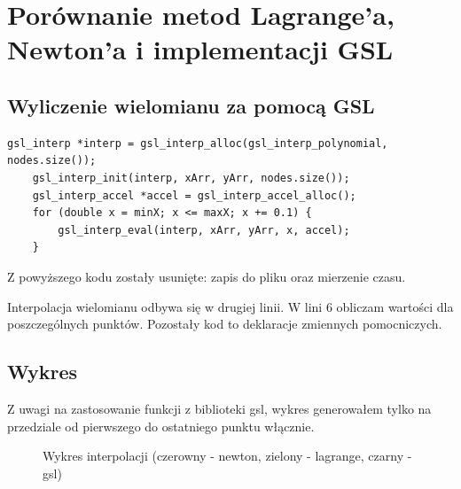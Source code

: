 \documentclass{article}
\begin{document}
    \pagebreak

    \section{Porównanie metod Lagrange'a, Newton'a i implementacji GSL}
    \subsection{Wyliczenie wielomianu za pomocą GSL}
    \lstset {language=C++}
    \begin{lstlisting}[caption={Interpolacja za pomocą GSL}]
    gsl_interp *interp = gsl_interp_alloc(gsl_interp_polynomial, nodes.size());
    gsl_interp_init(interp, xArr, yArr, nodes.size());
    gsl_interp_accel *accel = gsl_interp_accel_alloc();
    for (double x = minX; x <= maxX; x += 0.1) {
        gsl_interp_eval(interp, xArr, yArr, x, accel);
    }
    \end{lstlisting}

    Z powyższego kodu zostały usunięte: zapis do pliku oraz mierzenie czasu.

    Interpolacja wielomianu odbywa się w drugiej linii. W lini 6 obliczam wartości dla poszczególnych punktów.
    Pozostały kod to deklaracje zmiennych pomocniczych.

    \subsection{Wykres}
    Z uwagi na zastosowanie funkcji z biblioteki gsl, wykres generowałem tylko na przedziale od pierwszego do ostatniego punktu włącznie.
    \begin{figure}[h]
        \caption{\label{fig:allPoly} Wykres interpolacji (czerowny - newton, zielony - lagrange, czarny - gsl)}
    \end{figure}
\end{document}
